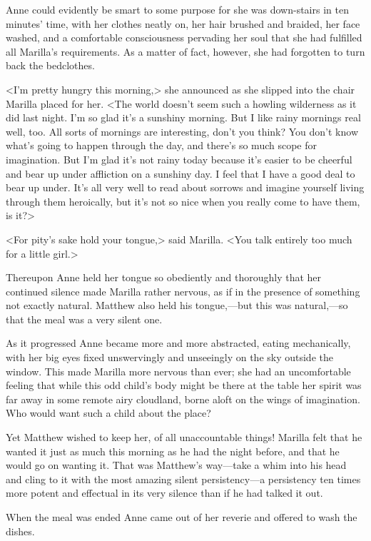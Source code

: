 Anne could evidently be smart to some purpose for she was down-stairs in ten minutes' time, with her clothes neatly on, her hair brushed and braided, her face washed, and a comfortable consciousness pervading her soul that she had fulfilled all Marilla's requirements. As a matter of fact, however, she had forgotten to turn back the bedclothes.

<I'm pretty hungry this morning,> she announced as she slipped into the chair Marilla placed for her. <The world doesn't seem such a howling wilderness as it did last night. I'm so glad it's a sunshiny morning. But I like rainy mornings real well, too. All sorts of mornings are interesting, don't you think? You don't know what's going to happen through the day, and there's so much scope for imagination. But I'm glad it's not rainy today because it's easier to be cheerful and bear up under affliction on a sunshiny day. I feel that I have a good deal to bear up under. It's all very well to read about sorrows and imagine yourself living through them heroically, but it's not so nice when you really come to have them, is it?>

<For pity's sake hold your tongue,> said Marilla. <You talk entirely too much for a little girl.>

Thereupon Anne held her tongue so obediently and thoroughly that her continued silence made Marilla rather nervous, as if in the presence of something not exactly natural. Matthew also held his tongue,—but this was natural,—so that the meal was a very silent one.

As it progressed Anne became more and more abstracted, eating mechanically, with her big eyes fixed unswervingly and unseeingly on the sky outside the window. This made Marilla more nervous than ever; she had an uncomfortable feeling that while this odd child's body might be there at the table her spirit was far away in some remote airy cloudland, borne aloft on the wings of imagination. Who would want such a child about the place?

Yet Matthew wished to keep her, of all unaccountable things! Marilla felt that he wanted it just as much this morning as he had the night before, and that he would go on wanting it. That was Matthew's way—take a whim into his head and cling to it with the most amazing silent persistency—a persistency ten times more potent and effectual in its very silence than if he had talked it out.

When the meal was ended Anne came out of her reverie and offered to wash the dishes.

